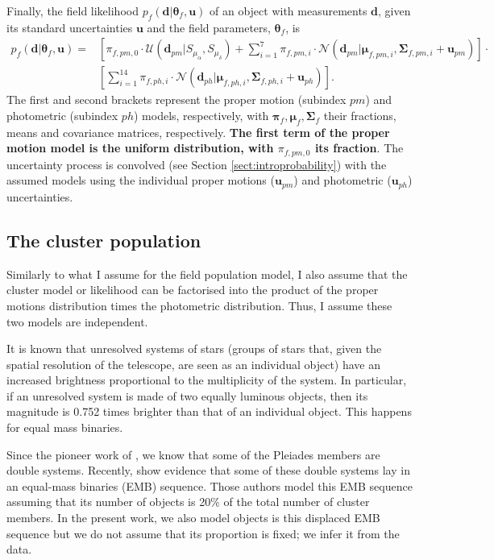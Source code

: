 Finally, the field likelihood $p_f(\mathbf{d}|\boldsymbol{\theta}_f,\mathbf{u})$ of an object with measurements $\mathbf{d}$, given its standard uncertainties $\mathbf{u}$ and the field parameters, $\boldsymbol{\theta}_f$, is
\begin{align}
p_f(\mathbf{d}|\boldsymbol{\theta}_f,\mathbf{u})=&\left[\pi_{f,pm,0}\cdot\mathcal{U}(\textbf{d}_{pm}|S_{\mu_{\alpha}},S_{\mu_{\delta}})+  \sum \limits_{i=1}^{7}\pi_{f,pm,i}\cdot \mathcal{N}(\mathbf{d}_{pm} | \boldsymbol{\mu}_{f,pm,i},\boldsymbol{\Sigma}_{f,pm,i}+\mathbf{u}_{pm})\right]\cdot  \nonumber \\ 
&\left[ \sum \limits_{i=1}^{14}\pi_{f,ph,i}\cdot \mathcal{N}(\mathbf{d}_{ph} | \boldsymbol{\mu}_{f,ph,i},\boldsymbol{\Sigma}_{f,ph,i}+\mathbf{u}_{ph})\right].
\label{eq:field}
\end{align}
The first and second brackets represent the proper motion (subindex $pm$) and photometric (subindex $ph$) models, respectively, with $\boldsymbol{\pi}_f,\boldsymbol{\mu}_f,\boldsymbol{\Sigma}_f$ their fractions, means and covariance matrices, respectively. \textbf{ The first term of the proper motion model is the uniform distribution, with $\pi_{f,pm,0}$ its fraction}. The uncertainty process is convolved (see Section \ref{sect:introprobability}) with the assumed models using the individual proper motions ($\mathbf{u}_{pm}$) and photometric ($\mathbf{u}_{ph}$) uncertainties. 

\subsection{The cluster population}
\label{subsect:cluster}
Similarly to what I assume for the field population model, I also assume that the cluster model or likelihood can be factorised into the product of the proper motions distribution times the photometric distribution. Thus, I assume these two models are independent. 

It is known that unresolved systems of stars (groups of stars that, given the spatial resolution of the telescope, are seen as an individual object) have an increased brightness proportional to the multiplicity of the system. In particular, if an unresolved system is made of two equally luminous objects, then its magnitude is 0.752 times brighter than that of an individual object. This happens for equal mass binaries.

Since the pioneer work of \citet{Trumpler1921}, we know that some of the Pleiades members are double systems. Recently, \citet{Sarro2014} show evidence that some of these double systems lay in an equal-mass binaries (EMB) sequence. Those authors model this EMB sequence assuming that its number of objects is 20\% of the total number of cluster members. In the present work, we also model objects is this displaced EMB sequence  but we do not assume that its proportion is fixed; we infer it from the data. 

